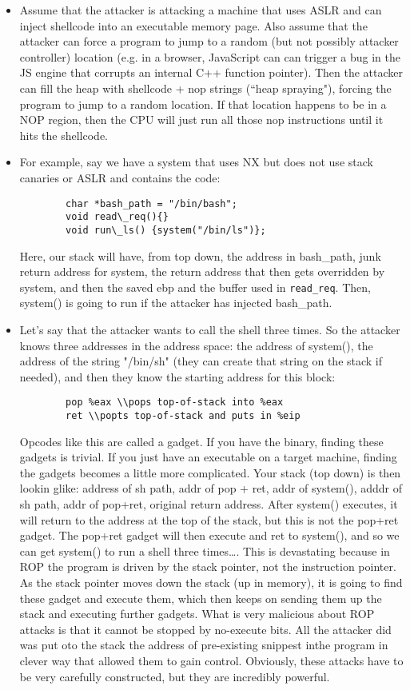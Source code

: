 \documentclass[12pt]{article}
\theoremstyle{definition}
\begin{document}
\begin{itemize}
    \item Assume that the attacker is attacking a machine that uses ASLR and can inject shellcode into an executable memory page. Also assume that the attacker can force a program to jump to a random (but not possibly attacker controller) location (e.g. in a browser, JavaScript can can trigger a bug in the JS engine that corrupts an internal C++ function pointer). Then the attacker can fill the heap with shellcode + nop strings (``heap spraying"), forcing the program to jump to a random location. If that location happens to be in a NOP region, then the CPU will just run all those nop instructions until it hits the shellcode.
    \item For example, say we have a system that uses NX but does not use stack canaries or ASLR and contains the code:
    \begin{lstlisting}
        char *bash_path = "/bin/bash";
        void read\_req(){}
        void run\_ls() {system("/bin/ls")};
    \end{lstlisting}
    Here, our stack will have, from top down, the address in bash\_path, junk return address for system, the return address that then gets overridden by system, and then the saved ebp and the buffer used in \texttt{read\_req}. Then, system() is going to run if the attacker has injected bash\_path.
    \item Let's say that the attacker wants to call the shell three times. So the attacker knows three addresses in the address space: the address of system(), the address of the string "/bin/sh" (they can create that string on the stack if needed), and then they know the starting address for this block:
    \begin{lstlisting}
        pop %eax \\pops top-of-stack into %eax
        ret \\popts top-of-stack and puts in %eip
    \end{lstlisting}
    Opcodes like this are called a gadget. If you have the binary, finding these gadgets is trivial. If you just have an executable on a target machine, finding the gadgets becomes a little more complicated. Your stack (top down) is then lookin glike: address of sh path, addr of pop + ret, addr of system(), adddr of sh path, addr of pop+ret, original return address. After system() executes, it will return to the address at the top of the stack, but this is not the pop+ret gadget. The pop+ret gadget will then execute and ret to system(), and so we can get system() to run a shell three times\ldots. This is devastating because in ROP the program is driven by the stack pointer, not the instruction pointer. As the stack pointer moves down the stack (up in memory), it is going to find these gadget and execute them, which then keeps on sending them up the stack and executing further gadgets. What is very malicious about ROP attacks is that it cannot be stopped by no-execute bits. All the attacker did was put oto the stack the address of pre-existing snippest inthe program in clever way that allowed them to gain control. Obviously, these attacks have to be very carefully constructed, but they are incredibly powerful.

\end{itemize}
\end{document}
